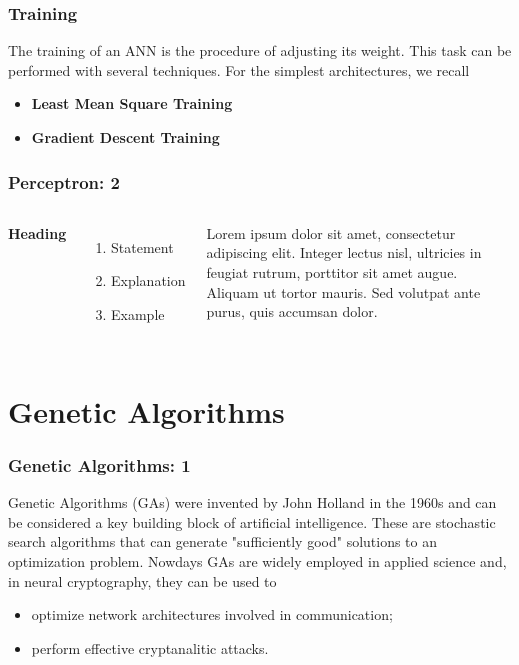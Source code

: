 \documentclass{beamer}
\begin{document}
\begin{frame}
\frametitle{Training}
The training of an ANN is the procedure of adjusting its weight. This task can be performed with several techniques. For the simplest architectures, we recall
\begin{itemize}
\item \textbf{Least Mean Square Training}
\item \textbf{Gradient Descent Training}
\end{itemize}
\end{frame}
\begin{frame}
\frametitle{Perceptron: 2}
\begin{columns}[c] %

\textbf{Heading}
\begin{enumerate}
\item Statement
\item Explanation
\item Example
\end{enumerate}

Lorem ipsum dolor sit amet, consectetur adipiscing elit. Integer lectus nisl, ultricies in feugiat rutrum, porttitor sit amet augue. Aliquam ut tortor mauris. Sed volutpat ante purus, quis accumsan dolor.

\end{columns}
\end{frame}


\section{Genetic Algorithms}

\begin{frame}
\frametitle{Genetic Algorithms: 1}
Genetic Algorithms (GAs) were invented by John Holland in the 1960s and can
be considered a key building block of artificial intelligence. These are stochastic search algorithms that can generate  
"sufficiently good" solutions to an optimization problem. Nowdays GAs are widely employed
in applied science and, in neural cryptography, they can be used to
\begin{itemize}
\item optimize network architectures involved in communication;
\item perform effective cryptanalitic attacks.
\end{itemize}
\end{frame}
\end{document}
